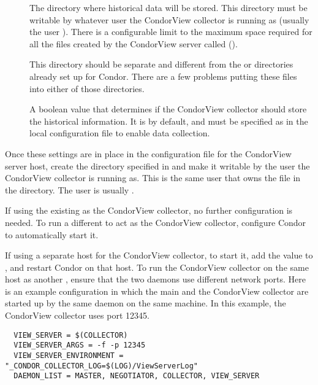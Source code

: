\begin{description}

\item[] The directory where
historical data will be stored.
This directory must be writable by whatever user the CondorView
collector is running as (usually the user ).  
There is a configurable limit to the maximum space required for all
the files created by the CondorView server called
(). 

\Note This directory should be separate and different from the
 or  directories already set up for
Condor.
There are a few problems putting these files into either of those
directories.

\item[] A boolean value that determines
if the CondorView collector should store the historical information.
It is  by default, and must be specified as  in
the local configuration file to enable data collection.

\end{description}

Once these settings are in place in the configuration file for the
CondorView server host, create the directory specified
in  and make it writable by the user the
CondorView collector is running as.
This is the same user that owns the  file in
the  directory. The user is usually .

If using the existing  as the CondorView collector,
no further configuration is needed.  
To run a different
 to act as the CondorView collector, configure
Condor to automatically start it.

If using a separate host for the CondorView collector,
to start it, add the value  to
, and restart Condor on that host.
To run the CondorView collector on the same host as another 
,
ensure that the two  daemons use different network ports.
Here is an example configuration in which the main  and the
CondorView collector are started up by the same  daemon on
the same machine.  In this example, the CondorView collector uses
port 12345.

\footnotesize
\begin{verbatim}
  VIEW_SERVER = $(COLLECTOR)
  VIEW_SERVER_ARGS = -f -p 12345
  VIEW_SERVER_ENVIRONMENT = "_CONDOR_COLLECTOR_LOG=$(LOG)/ViewServerLog"
  DAEMON_LIST = MASTER, NEGOTIATOR, COLLECTOR, VIEW_SERVER
\end{verbatim}
\normalsize

